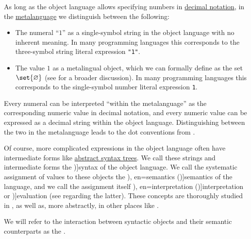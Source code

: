 \begin{concept}\label{con:syntax_semantics_duality}
  As long as the object language allows specifying numbers in \hyperref[def:positional_number_system/decimal]{decimal notation}, in the \hyperref[con:metalanguage]{metalanguage} we distinguish between the following:
  \begin{itemize}
    \item The numeral \enquote{\( 1 \)} as a single-symbol string in the object language with no inherent meaning. In many programming languages this corresponds to the three-symbol string literal expression \texttt{"1"}.

    \item The value \( 1 \) as a metalingual object, which we can formally define as the set \( \set{ \varnothing } \) (see  for a broader discussion). In many programming languages this corresponds to the single-symbol number literal expression \texttt{1}.
  \end{itemize}

  Every numeral can be interpreted \enquote{within the metalanguage} as the corresponding numeric value in decimal notation, and every numeric value can be expressed as a decimal string within the object language. Distinguishing between the two in the metalanguage leads to the dot conventions from .

  Of course, more complicated expressions in the object language often have intermediate forms like \hyperref[con:abstract_syntax_tree]{abstract syntax trees}. We call these strings and intermediate forms the \term[en=syntax (\cite[8]{Hinman2005Logic})]{syntax} of the object language. We call the systematic assignment of values to these objects the \term[ru=семантика (\cite[54]{КолмогоровДрагалин2006Логика}), en=semantics (\cite[8]{Hinman2005Logic})]{semantics} of the language, and we call the assignment itself \term[ru=интерпретация (\cite[17]{Герасимов2011Вычислимость}), en=interpretation (\cite[10]{Smullyan1995FOL})]{interpretation} or \term[ru=оценка (\cite[77]{ШеньВерещагин2017ЯзыкиИИсчисления})]{evaluation} (see  regarding the latter). These concepts are thoroughly studied in , as well as, more abstractly, in other places like .

  We will refer to the interaction between syntactic objects and their semantic counterparts as the .
\end{concept}

